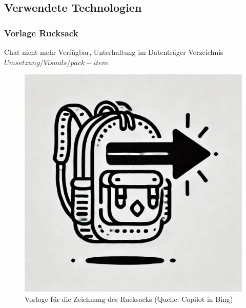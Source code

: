 \documentclass[
	12pt,
	a4paper,
	bibtotoc,
	cleardoubleempty, 
	idxtotoc,
	ngerman,
	openright
	final,
	listof=nochaptergap,
	]{scrbook}
\begin{document}
\begin{appendices}
\subsection{Verwendete Technologien}

\subsubsection{Vorlage Rucksack}\label{sec:append_realisation_vorlage_rucksack}
Chat nicht mehr Verfügbar, Unterhaltung im Datenträger Verzeichnis $Umsetzung/Visuals/pack-item$

\begin{figure}[ht]
\centering
\includegraphics[width=1\linewidth]{content/attachments/vorlagen/Vorlage_Rucksack.png}
\caption{Vorlage für die Zeichnung des Rucksacks (Quelle: Copilot in Bing)}
\label{fig:vorlage_rucksack}
\end{figure}
\clearpage


\end{appendices}
\end{document}
